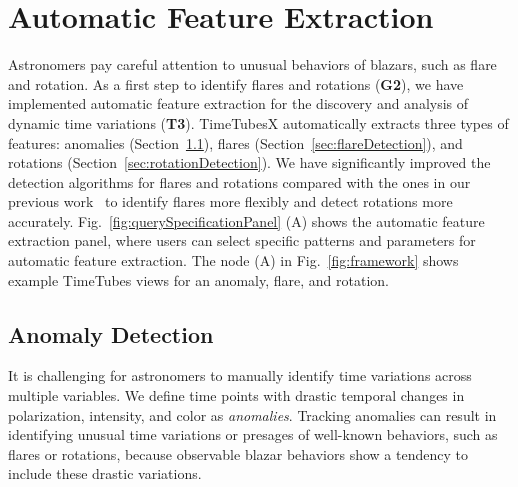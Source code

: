 \section{Automatic Feature Extraction}\label{sec:automaticExtraction}
Astronomers pay careful attention to unusual behaviors of blazars, such as flare and rotation.
As a first step to identify flares and rotations (\textbf{G2}),
we have implemented automatic feature extraction for the discovery and analysis of dynamic time variations (\textbf{T3}).
TimeTubesX automatically extracts three types of features: anomalies (Section~\ref{sec:anomalyDetection}), flares (Section~\ref{sec:flareDetection}), and rotations (Section~\ref{sec:rotationDetection}).
We have significantly improved the detection algorithms for flares and rotations compared with the ones in our previous work~\cite{Sawada2018} 
to identify flares more flexibly and detect rotations more accurately.
Fig.~\ref{fig:querySpecificationPanel} (A) shows the automatic feature extraction panel, %
where users can select specific patterns and parameters for automatic feature extraction.
The node (A) in Fig.~\ref{fig:framework} shows example TimeTubes views for an anomaly, flare, and rotation.

\subsection{Anomaly Detection}\label{sec:anomalyDetection}
It is challenging for astronomers to manually identify time variations across multiple variables. 
We define time points with drastic temporal changes in polarization, intensity, and color as \textit{anomalies}.
Tracking anomalies can result in identifying unusual time variations or presages of well-known behaviors, such as flares or rotations,
because observable blazar behaviors show a tendency to include these drastic variations.

